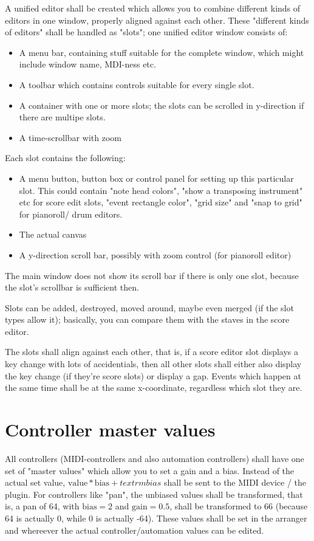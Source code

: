 \documentclass[a4paper]{report}
\begin{document}
A unified editor shall be created which allows you to combine different
kinds of editors in one window, properly aligned against each other.
These "different kinds of editors" shall be handled as "slots"; one
unified editor window consists of:
\begin{itemize}
\item A menu bar, containing stuff suitable for the complete window,
      which might include window name, MDI-ness etc.
\item A toolbar which contains controls suitable for every single slot.
\item A container with one or more slots; the slots can be scrolled in
      y-direction if there are multipe slots.
\item A time-scrollbar with zoom
\end{itemize}

Each slot contains the following:
\begin{itemize}
\item A menu button, button box or control panel for setting up this
      particular slot. This could contain "note head colors", "show
      a transposing instrument" etc for score edit slots, "event
      rectangle color", "grid size" and "snap to grid" for pianoroll/
      drum editors.
\item The actual canvas
\item A y-direction scroll bar, possibly with zoom control (for
      pianoroll editor)
\end{itemize}

The main window does not show its scroll bar if there is only one slot,
because the slot's scrollbar is sufficient then.

Slots can be added, destroyed, moved around, maybe even merged (if the
slot types allow it); basically, you can compare them with the staves
in the score editor.

The slots shall align against each other, that is, if a score editor
slot displays a key change with lots of accidentials, then all other
slots shall either also display the key change (if they're score slots)
or display a gap. Events which happen at the same time shall be at the
same x-coordinate, regardless which slot they are.

\section{Controller master values}
All controllers (MIDI-controllers and also automation controllers)
shall have one set of "master values" which allow you to set a gain and
a bias. Instead of the actual set value, $\textrm{value} * \textrm{bias}
+ textrm{bias}$ shall be sent to the MIDI device / the plugin. For
controllers like "pan", the unbiased values shall be transformed, that
is, a pan of 64, with $\textrm{bias}=2$ and $\textrm{gain}=0.5$, shall
be transformed to 66 (because 64 is actually 0, while 0 is actually -64).
These values shall be set in the arranger and whereever the actual
controller/automation values can be edited.
\end{document}

